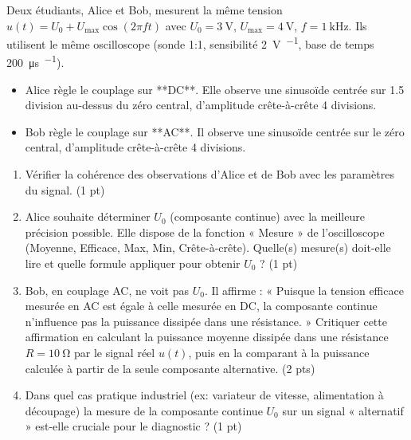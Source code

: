 \documentclass[11pt]{article}
\begin{document}
\begin{exercice}
Deux étudiants, Alice et Bob, mesurent la même tension $u(t) = U_0 + U_{\text{max}}\cos(2\pi f t)$ avec $U_0 = \SI{3}{\volt}$, $U_{\text{max}} = \SI{4}{\volt}$, $f = \SI{1}{\kilo\hertz}$. Ils utilisent le même oscilloscope (sonde 1:1, sensibilité \SI{2}{\volt\per\division}, base de temps \SI{200}{\micro\second\per\division}).
\begin{itemize}
    \item Alice règle le couplage sur **DC**. Elle observe une sinusoïde centrée sur \num{1,5} division au-dessus du zéro central, d'amplitude crête-à-crête \num{4} divisions.
    \item Bob règle le couplage sur **AC**. Il observe une sinusoïde centrée sur le zéro central, d'amplitude crête-à-crête \num{4} divisions.
\end{itemize}
\begin{enumerate}
    \item Vérifier la cohérence des observations d'Alice et de Bob avec les paramètres du signal. (1 pt)
    \item Alice souhaite déterminer $U_0$ (composante continue) avec la meilleure précision possible. Elle dispose de la fonction « Mesure » de l'oscilloscope (Moyenne, Efficace, Max, Min, Crête-à-crête). Quelle(s) mesure(s) doit-elle lire et quelle formule appliquer pour obtenir $U_0$ ? (1 pt)
    \item Bob, en couplage AC, ne voit pas $U_0$. Il affirme : « Puisque la tension efficace mesurée en AC est égale à celle mesurée en DC, la composante continue n'influence pas la puissance dissipée dans une résistance. » Critiquer cette affirmation en calculant la puissance moyenne dissipée dans une résistance $R = \SI{10}{\ohm}$ par le signal réel $u(t)$, puis en la comparant à la puissance calculée à partir de la seule composante alternative. (2 pts)
    \item Dans quel cas pratique industriel (ex: variateur de vitesse, alimentation à découpage) la mesure de la composante continue $U_0$ sur un signal « alternatif » est-elle cruciale pour le diagnostic ? (1 pt)
\end{enumerate}
\end{exercice}
\end{document}

